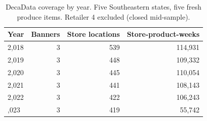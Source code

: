 \begin{table}[!h]
\centering
\caption{\label{tab:tab:decadata_summary}DecaData coverage by year. Five Southeastern states, five fresh produce items. Retailer 4 excluded (closed mid-sample).}
\centering
\begin{tabular}[t]{lrrr}
\toprule
Year & Banners & Store locations & Store-product-weeks\\
\midrule
2,018 & 3 & 539 & 114,931\\
2,019 & 3 & 448 & 109,332\\
2,020 & 3 & 445 & 110,054\\
2,021 & 3 & 441 & 108,143\\
2,022 & 3 & 422 & 106,243\\
\addlinespace
2,023 & 3 & 419 & 55,742\\
\bottomrule
\end{tabular}
\end{table}

